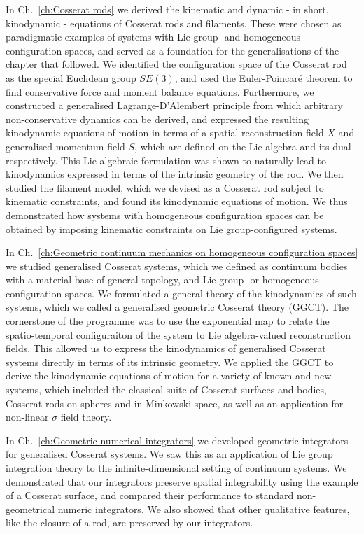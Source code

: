 \documentclass[]{cam-thesis}
\begin{document}
In Ch.~\ref{ch:Cosserat rods} we derived the kinematic and dynamic - in short, kinodynamic - equations of Cosserat rods and filaments. These were chosen as paradigmatic examples of systems with Lie group- and homogeneous configuration spaces, and served as a foundation for the generalisations of the chapter that followed. We identified the configuration space of the Cosserat rod as the special Euclidean group $SE(3)$, and used the Euler-Poincaré theorem to find conservative force and moment balance equations. Furthermore, we constructed a generalised Lagrange-D'Alembert principle from which arbitrary non-conservative dynamics can be derived, and expressed the resulting kinodynamic equations of motion in terms of a spatial reconstruction field $X$ and generalised momentum field $S$, which are defined on the Lie algebra and its dual respectively. This Lie algebraic formulation was shown to naturally lead to kinodynamics expressed in terms of the intrinsic geometry of the rod. We then studied the filament model, which we devised as a Cosserat rod subject to kinematic constraints, and found its kinodynamic equations of motion. We thus demonstrated how systems with homogeneous configuration spaces can be obtained by imposing kinematic constraints on Lie group-configured systems.

In Ch.~\ref{ch:Geometric continuum mechanics on homogeneous configuration spaces} we studied generalised Cosserat systems, which we defined as continuum bodies with a material base of general topology, and Lie group- or homogeneous configuration spaces. We formulated a general theory of the kinodynamics of such systems, which we called a generalised geometric Cosserat theory (GGCT). The cornerstone of the programme was to use the exponential map to relate the spatio-temporal configuraiton of the system to Lie algebra-valued reconstruction fields. This allowed us to express the kinodynamics of generalised Cosserat systems directly in terms of its intrinsic geometry. We applied the GGCT to derive the kinodynamic equations of motion for a variety of known and new systems, which included the classical suite of Cosserat surfaces and bodies, Cosserat rods on spheres and in Minkowski space, as well as an application for non-linear $\sigma$ field theory.

In Ch.~\ref{ch:Geometric numerical integrators} we developed geometric integrators for generalised Cosserat systems. We saw this as an application of Lie group integration theory to the infinite-dimensional setting of continuum systems. We demonstrated that our integrators preserve spatial integrability using the example of a Cosserat surface, and compared their performance to standard non-geometrical numeric integrators. We also showed that other qualitative features, like the closure of a rod, are preserved by our integrators.
\end{document}

